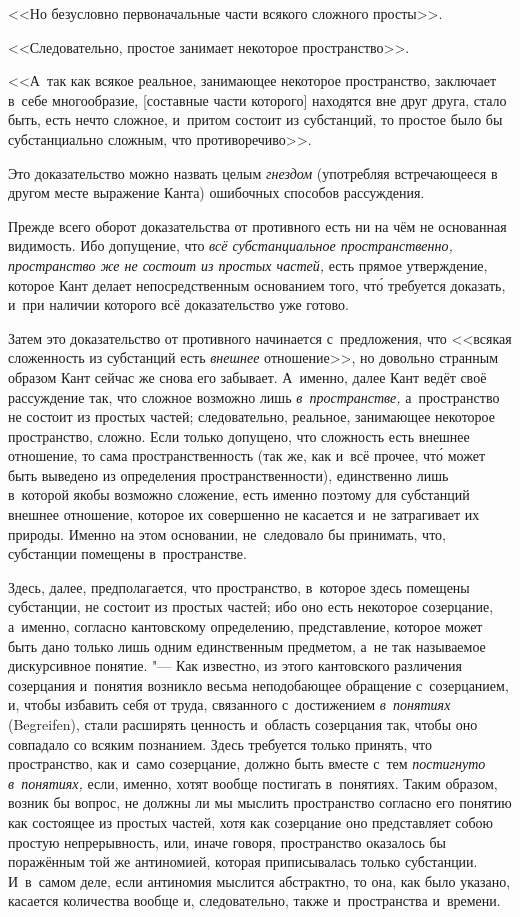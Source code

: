 <<Но безусловно первоначальные части всякого сложного просты>>.

<<Следовательно, простое занимает некоторое пространство>>.

<<А~так как всякое реальное, занимающее некоторое пространство, заключает
в~себе многообразие, [составные части которого] находятся вне друг друга,
стало быть, есть нечто сложное, и~притом состоит из субстанций, то простое
было бы субстанциально сложным, что противоречиво>>.

Это доказательство можно назвать целым {\em гнездом} (употребляя встречающееся
в другом месте выражение Канта) ошибочных способов рассуждения.

Прежде всего оборот доказательства от противного есть ни на чём не основанная
видимость. Ибо допущение, что {\em всё субстанциальное пространственно,
пространство же не состоит из простых частей,} есть прямое утверждение,
которое Кант делает непосредственным основанием того, чт\'{о} требуется
доказать, и~при наличии которого всё доказательство уже готово.

Затем это доказательство от противного начинается с~предложения, что <<всякая
сложенность из субстанций есть {\em внешнее} отношение>>, но довольно странным
образом Кант сейчас же снова его забывает. А~именно, далее Кант ведёт своё
рассуждение так, что сложное возможно лишь {\em в~пространстве,} а~пространство
не состоит из простых частей; следовательно, реальное, занимающее некоторое
пространство, сложно. Если только допущено, что сложность есть внешнее
отношение, то сама пространственность (так же, как и~всё прочее, чт\'{о} может
быть выведено из определения пространственности), единственно лишь в~которой
якобы возможно сложение, есть именно поэтому для субстанций внешнее отношение,
которое их совершенно не касается и~не затрагивает их природы. Именно на этом
основании, не~следовало бы принимать, что, субстанции помещены в~пространстве.

Здесь, далее, предполагается, что пространство, в~которое здесь помещены
субстанции, не состоит из простых частей; ибо оно есть некоторое созерцание,
а~именно, согласно кантовскому определению, представление, которое может быть
дано только лишь одним единственным предметом, а~не так называемое дискурсивное
понятие. "--- Как известно, из этого кантовского различения созерцания
и~понятия возникло весьма неподобающее обращение с~созерцанием, и, чтобы
избавить себя от труда, связанного с~достижением {\em в~понятиях} (Begreifen),
стали расширять ценность и~область созерцания так, чтобы оно совпадало со
всяким познанием. Здесь требуется только принять, что пространство, как и~само
созерцание, должно быть вместе с~тем {\em постигнуто в~понятиях,} если, именно,
хотят вообще постигать в~понятиях. Таким образом, возник бы вопрос, не должны
ли мы мыслить пространство согласно его понятию как состоящее из простых
частей, хотя как созерцание оно представляет собою простую непрерывность, или,
иначе говоря, пространство оказалось бы поражённым той же антиномией, которая
приписывалась только субстанции. И~в~самом деле, если антиномия мыслится
абстрактно, то она, как было указано, касается количества вообще и,
следовательно, также и~пространства и~времени.

